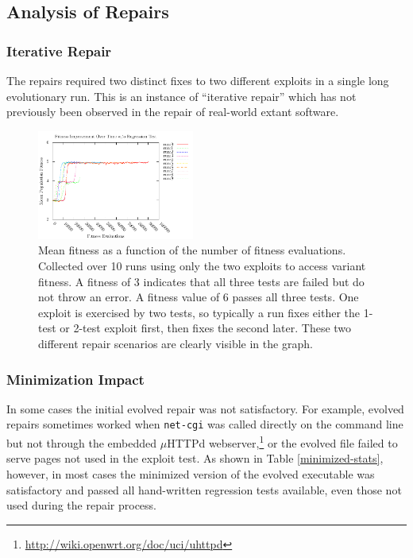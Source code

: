 \documentclass{sigcomm-alternate}
\begin{document}
\subsection{Analysis of Repairs}
\label{sec-4-2}

\subsubsection{Iterative Repair}
\label{sec-4-2-1}
The repairs required two distinct fixes to two different exploits in a
single long evolutionary run.  This is an instance of ``iterative
repair'' which has not previously been observed in the repair of
real-world extant software.

\begin{figure}[htb]
  \centering
  \includegraphics[bb=0 0 355 248,width=0.46\textwidth]{fitness-improvement.pdf}
  \caption{Mean fitness as a function of the number of fitness
    evaluations.  Collected over 10 runs using only the two exploits
    to access variant fitness.  A fitness of 3 indicates that all
    three tests are failed but do not throw an error.  A fitness value
    of 6 passes all three tests.  One exploit is exercised by two
    tests, so typically a run fixes either the 1-test or 2-test
    exploit first, then fixes the second later.  These two different
    repair scenarios are clearly visible in the graph.}
  \label{fit-by-time}
\end{figure}

\subsubsection{Minimization Impact}
\label{sec-4-2-2}

In some cases the initial evolved repair was not satisfactory.  For
example, evolved repairs sometimes worked when \texttt{net-cgi} was
called directly on the command line but not through the embedded
$\mu$HTTPd webserver,\footnote{\url{http://wiki.openwrt.org/doc/uci/uhttpd}}
or the evolved file failed to serve pages not used in the
exploit test.  As shown in Table \ref{minimized-stats}, however, in most
cases the minimized version of the evolved executable was satisfactory
and passed all hand-written regression tests available, even those not used
during the repair process. 
\end{document}
